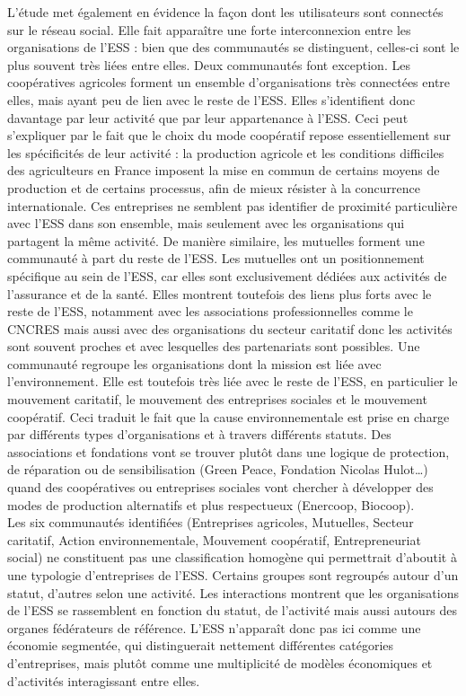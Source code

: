             L’étude met également en évidence la façon dont les utilisateurs sont connectés sur le réseau social. Elle fait apparaître une forte interconnexion entre les organisations de l’ESS : bien que des communautés se distinguent, celles-ci sont le plus souvent très liées entre elles. Deux communautés font exception. Les coopératives agricoles forment un ensemble d’organisations très connectées entre elles, mais ayant peu de lien avec le reste de l’ESS. Elles s’identifient donc davantage par leur activité que par leur appartenance à l’ESS. Ceci peut s’expliquer par le fait que le choix du mode coopératif repose essentiellement sur les spécificités de leur activité : la production agricole et les conditions difficiles des agriculteurs en France imposent la mise en commun de certains moyens de production et de certains processus, afin de mieux résister à la concurrence internationale. Ces entreprises ne semblent pas identifier de proximité particulière avec l’ESS dans son ensemble, mais seulement avec les organisations qui partagent la même activité.
            De manière similaire, les mutuelles forment une communauté à part du reste de l’ESS. Les mutuelles ont un positionnement spécifique au sein de l’ESS, car elles sont exclusivement dédiées aux activités de l’assurance et de la santé. Elles montrent toutefois des liens plus forts avec le reste de l’ESS, notamment avec les associations professionnelles comme le CNCRES mais aussi avec des organisations du secteur caritatif donc les activités sont souvent proches et avec lesquelles des partenariats sont possibles.
            Une communauté regroupe les organisations dont la mission est liée avec l’environnement. Elle est toutefois très liée avec le reste de l’ESS, en particulier le mouvement caritatif, le mouvement des entreprises sociales et le mouvement coopératif. Ceci traduit le fait que la cause environnementale est prise en charge par différents types d’organisations et à travers différents statuts. Des associations et fondations vont se trouver plutôt dans une logique de protection, de réparation ou de sensibilisation (Green Peace, Fondation Nicolas Hulot…) quand des coopératives ou entreprises sociales vont chercher à développer des modes de production alternatifs et plus respectueux (Enercoop, Biocoop).\\

            Les six communautés identifiées (Entreprises agricoles, Mutuelles, Secteur caritatif, Action environnementale, Mouvement coopératif, Entrepreneuriat social) ne constituent pas une classification homogène qui permettrait d’aboutit à une typologie d’entreprises de l’ESS. Certains groupes sont regroupés autour d’un statut, d’autres selon une activité. Les interactions montrent que les organisations de l’ESS se rassemblent en fonction du statut, de l’activité mais aussi autours des organes fédérateurs de référence. L’ESS n’apparaît donc pas ici comme une économie segmentée, qui distinguerait nettement différentes catégories d’entreprises, mais plutôt comme une multiplicité de modèles économiques et d’activités interagissant entre elles.

